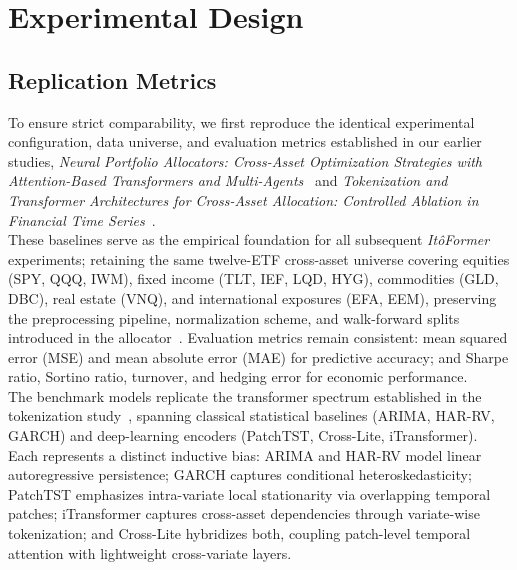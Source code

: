 \documentclass[10pt,twocolumn]{article}
\begin{document}

\section{Experimental Design}

\subsection{Replication Metrics}

To ensure strict comparability, we first reproduce the identical experimental configuration, data universe, and evaluation metrics established in our earlier studies, \textit{Neural Portfolio Allocators: Cross-Asset Optimization Strategies with Attention-Based Transformers and Multi-Agents}~\cite{coulter2025neural} and \textit{Tokenization and Transformer Architectures for Cross-Asset Allocation: Controlled Ablation in Financial Time Series}~\cite{coulter2025tokenization}.\\ 

These baselines serve as the empirical foundation for all subsequent \emph{It\^oFormer} experiments; retaining the same twelve-ETF cross-asset universe covering equities (SPY, QQQ, IWM), fixed income (TLT, IEF, LQD, HYG), commodities (GLD, DBC), real estate (VNQ), and international exposures (EFA, EEM), preserving the preprocessing pipeline, normalization scheme, and walk-forward splits introduced in the allocator~\cite{coulter2025neural}. Evaluation metrics remain consistent: mean squared error (MSE) and mean absolute error (MAE) for predictive accuracy; and Sharpe ratio, Sortino ratio, turnover, and hedging error for economic performance.\\

The benchmark models replicate the transformer spectrum established in the tokenization study~\cite{coulter2025tokenization}, spanning classical statistical baselines (ARIMA, HAR-RV, GARCH) and deep-learning encoders (PatchTST, Cross-Lite, iTransformer). Each represents a distinct inductive bias: ARIMA and HAR-RV model linear autoregressive persistence; GARCH captures conditional heteroskedasticity; PatchTST emphasizes intra-variate local stationarity via overlapping temporal patches; iTransformer captures cross-asset dependencies through variate-wise tokenization; and Cross-Lite hybridizes both, coupling patch-level temporal attention with lightweight cross-variate layers. \\
\end{document}
